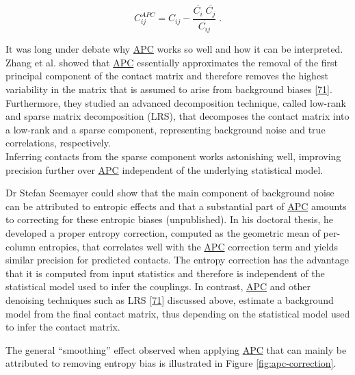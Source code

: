 \documentclass[12pt,a4paper,twoside]{book}
\theoremstyle{definition}
\theoremstyle{definition}
\theoremstyle{remark}
\begin{document}
\begin{equation}
    C_{ij}^{APC}  = C_{ij} - \frac{\overline{C_i} \; \overline{C_j}}{\overline{C_{ij}}}\; .
\label{eq:apc}
\end{equation}

It was long under debate why \protect\hyperlink{abbrev}{APC} works so
well and how it can be interpreted. Zhang et al. showed that
\protect\hyperlink{abbrev}{APC} essentially approximates the removal of
the first principal component of the contact matrix and therefore
removes the highest variability in the matrix that is assumed to arise
from background biases {[}\protect\hyperlink{ref-Zhang2016}{71}{]}.
Furthermore, they studied an advanced decomposition technique, called
low-rank and sparse matrix decomposition (LRS), that decomposes the
contact matrix into a low-rank and a sparse component, representing
background noise and true correlations, respectively.\\
Inferring contacts from the sparse component works astonishing well,
improving precision further over \protect\hyperlink{abbrev}{APC}
independent of the underlying statistical model.

Dr Stefan Seemayer could show that the main component of background
noise can be attributed to entropic effects and that a substantial part
of \protect\hyperlink{abbrev}{APC} amounts to correcting for these
entropic biases (unpublished). In his doctoral thesis, he developed a
proper entropy correction, computed as the geometric mean of per-column
entropies, that correlates well with the \protect\hyperlink{abbrev}{APC}
correction term and yields similar precision for predicted contacts. The
entropy correction has the advantage that it is computed from input
statistics and therefore is independent of the statistical model used to
infer the couplings. In contrast, \protect\hyperlink{abbrev}{APC} and
other denoising techniques such as LRS
{[}\protect\hyperlink{ref-Zhang2016}{71}{]} discussed above, estimate a
background model from the final contact matrix, thus depending on the
statistical model used to infer the contact matrix.

The general ``smoothing'' effect observed when applying
\protect\hyperlink{abbrev}{APC} that can mainly be attributed to
removing entropy bias is illustrated in Figure \ref{fig:apc-correction}.
\end{document}

